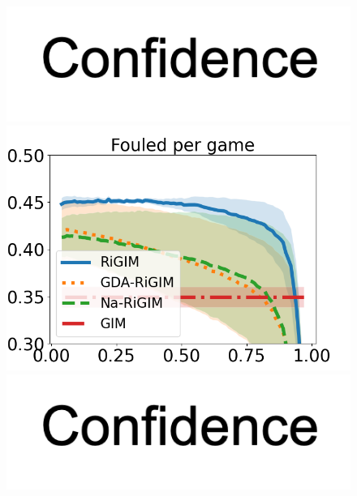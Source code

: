 \documentclass[letterpaper]{article} %
\begin{document}
\begin{figure}[htbp]
\begin{minipage}{0.16\textwidth}
    \vspace{-0.05in}
    \includegraphics[scale=0.12]{figures/confidence_x_label.png}
    \end{minipage}
    \begin{minipage}{0.16\textwidth}
    \centering
    \includegraphics[scale=0.16]{figures/soccer_risk_curve_Fouled_shadow.png}\par
    \vspace{-0.05in}
    \includegraphics[scale=0.12]{figures/confidence_x_label.png}
    \end{minipage}
    \begin{minipage}{0.16\textwidth}
    \centering

\end{minipage}
\end{figure}
\end{document}
